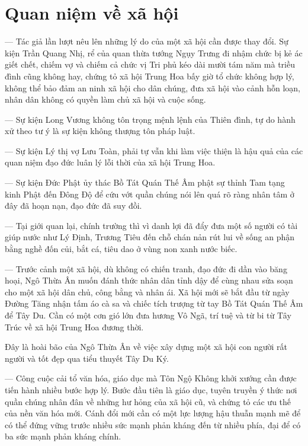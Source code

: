 
\section{Quan niệm về xã hội} %
\label{sec:9_xa_hoi}

— Tác giả lần lượt nêu lên những lý do của một xã hội cần được thay đổi. Sự kiện Trần Quang Nhị, rể của quan thừa tướng Ngụy Trưng đi nhậm chức bị kẻ ác giết chết, chiếm vợ và chiếm cả chức vị Tri phủ kéo dài mười tám năm mà triều đình cũng không hay, chứng tỏ xã hội Trung Hoa bấy giờ tổ chức không hợp lý, không thể bảo đảm an ninh xã hội cho dân chúng, đưa xã hội vào cảnh hỗn loạn, nhân dân không có quyền làm chủ xã hội và cuộc sống.

— Sự kiện Long Vương không tôn trọng mệnh lệnh của Thiên đình, tự do hành xử theo tư ý là sự kiện không thượng tôn pháp luật.

— Sự kiện Lý thị vợ Lưu Toàn, phải tự vẫn khi làm việc thiện là hậu quả của các quan niệm đạo đức luân lý lỗi thời của xã hội Trung Hoa.

— Sự kiện Đức Phật ủy thác Bồ Tát Quán Thế Âm phật sự thỉnh Tam tạng kinh Phật đến Đông Độ để cứu vớt quần chúng nói lên quá rõ ràng nhân tâm ở đây đã hoạn nạn, đạo đức đã suy đồi.

— Tại giới quan lại, chính trường thì vì danh lợi đã đẩy đưa một số người có tài giúp nước như Lý Định, Trương Tiêu đến chỗ chán nản rút lui về sống an phận bằng nghề đốn củi, bắt cá, tiêu dao ở vùng non xanh nước biếc.

— Trước cảnh một xã hội, dù không có chiến tranh, đạo đức đi dần vào băng hoại, Ngô Thừa Ân muốn đánh thức nhân dân tỉnh dậy để cùng nhau sửa soạn cho một xã hội dân chủ, công bằng và nhân ái. Xã hội mới sẽ bắt đầu từ ngày Đường Tăng nhận tấm áo cà sa và chiếc tích trượng từ tay Bồ Tát Quán Thế Âm để Tây Du. Cần có một cơn gió lớn đưa hương Vô Ngã, trí tuệ và từ bi từ Tây Trúc về xã hội Trung Hoa đương thời.

Đây là hoài bão của Ngô Thừa Ân về việc xây dựng một xã hội con người rất người và tốt đẹp qua tiểu thuyết Tây Du Ký.

— Công cuộc cải tổ văn hóa, giáo dục mà Tôn Ngộ Không khởi xướng cần được tiến hành nhiều bước hợp lý. Bước đầu tiên là giáo dục, tuyên truyền ý thức nơi quần chúng nhân đân về những hư hỏng của xã hội cũ, và chứng tỏ các ưu thế của nền văn hóa mới. Cánh đổi mới cần có một lực lượng hậu thuẫn mạnh mẽ để có thể đứng vững trước nhiều sức mạnh phản kháng đến từ nhiều phía, đại để có ba sức mạnh phản kháng chính.

